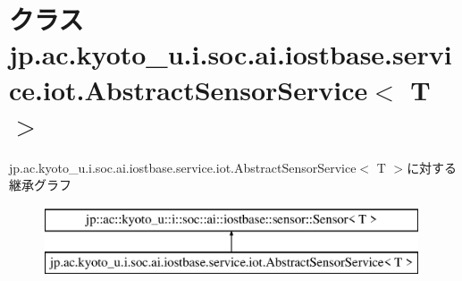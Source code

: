 \hypertarget{classjp_1_1ac_1_1kyoto__u_1_1i_1_1soc_1_1ai_1_1iostbase_1_1service_1_1iot_1_1_abstract_sensor_service_3_01_t_01_4}{\section{クラス jp.\-ac.\-kyoto\-\_\-u.\-i.\-soc.\-ai.\-iostbase.\-service.\-iot.\-Abstract\-Sensor\-Service$<$ T $>$}
\label{classjp_1_1ac_1_1kyoto__u_1_1i_1_1soc_1_1ai_1_1iostbase_1_1service_1_1iot_1_1_abstract_sensor_service_3_01_t_01_4}
}
jp.\-ac.\-kyoto\-\_\-u.\-i.\-soc.\-ai.\-iostbase.\-service.\-iot.\-Abstract\-Sensor\-Service$<$ T $>$に対する継承グラフ\begin{figure}[H]
\begin{center}
\leavevmode
\includegraphics[height=2.000000cm]{classjp_1_1ac_1_1kyoto__u_1_1i_1_1soc_1_1ai_1_1iostbase_1_1service_1_1iot_1_1_abstract_sensor_service_3_01_t_01_4}
\end{center}
\end{figure}
